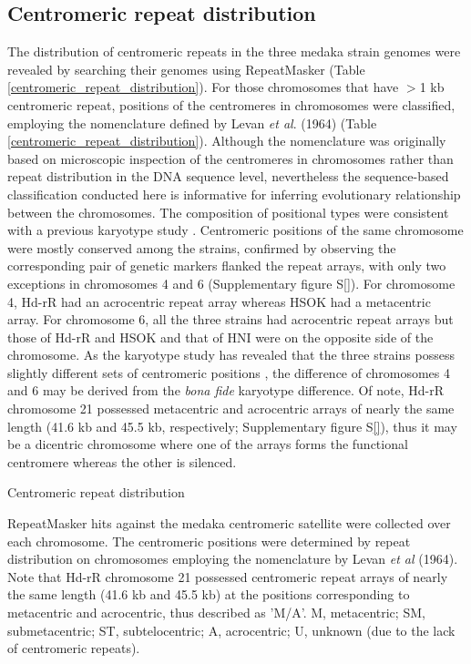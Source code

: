 \subsection*{Centromeric repeat distribution}
The distribution of centromeric repeats in the three medaka strain genomes were revealed by searching their genomes using RepeatMasker (Table \ref{centromeric_repeat_distribution}). For those chromosomes that have $>$1 kb centromeric repeat, positions of the centromeres in chromosomes were classified, employing the nomenclature defined by Levan \textit{et al}. (1964) (Table \ref{centromeric_repeat_distribution}). Although the nomenclature was originally based on microscopic inspection of the centromeres in chromosomes rather than repeat distribution in the DNA sequence level, nevertheless the sequence-based classification conducted here is informative for inferring evolutionary relationship between the chromosomes. The composition of positional types were consistent with a previous karyotype study \cite{}. Centromeric positions of the same chromosome were mostly conserved among the strains, confirmed by observing the corresponding pair of genetic markers flanked the repeat arrays, with only two exceptions in chromosomes 4 and 6 (Supplementary figure S\ref{}). For chromosome 4, Hd-rR had an acrocentric repeat array whereas HSOK had a metacentric array. For chromosome 6, all the three strains had acrocentric repeat arrays but those of Hd-rR and HSOK and that of HNI were on the opposite side of the chromosome. As the karyotype study has revealed that the three strains possess slightly different sets of centromeric positions \cite{}, the difference of chromosomes 4 and 6 may be derived from the \textit{bona fide} karyotype difference. Of note, Hd-rR chromosome 21 possessed metacentric and acrocentric arrays of nearly the same length (41.6 kb and 45.5 kb, respectively; Supplementary figure S\ref{}), thus it may be a dicentric chromosome where one of the arrays forms the functional centromere whereas the other is silenced.


\begin{table*}[htp]
  \centering
  \caption{Centromeric repeat distribution}
  
  \label{centromeric_repeat_distribution}
  \caption*{{\small
    RepeatMasker hits against the medaka centromeric satellite were collected over each chromosome. The centromeric positions were determined by repeat distribution on chromosomes employing the nomenclature by Levan \textit{et al} (1964). Note that Hd-rR chromosome 21 possessed centromeric repeat arrays of nearly the same length (41.6 kb and 45.5 kb) at the positions corresponding to metacentric and acrocentric, thus described as 'M/A'. M, metacentric; SM, submetacentric; ST, subtelocentric; A, acrocentric; U, unknown (due to the lack of centromeric repeats).
  }}
\end{table*}



